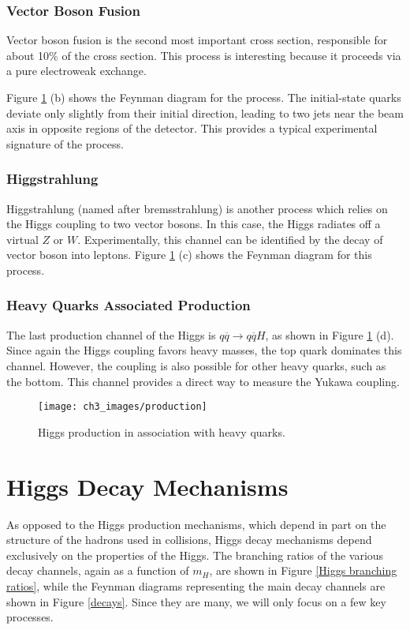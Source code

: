 \documentclass[10pt,a4paper]{book}
\begin{document}
\subsubsection{Vector Boson Fusion}
Vector boson fusion is the second most important cross section, responsible for about 10\% of the cross section. This process is interesting because it proceeds via a pure electroweak exchange. 

Figure \ref{production} (b) shows the Feynman diagram for the process. The initial-state quarks deviate only slightly from their initial direction, leading to two jets near the beam axis in opposite regions of the detector. This provides a typical experimental signature of the process. 


\subsubsection{Higgstrahlung}
Higgstrahlung (named after bremsstrahlung) is another process which relies on the Higgs coupling to two vector bosons. In this case, the Higgs radiates off a virtual $Z$ or $W$. Experimentally, this channel can be identified by the decay of vector boson into leptons. Figure \ref{production} (c) shows the Feynman diagram for this process.


\subsubsection{Heavy Quarks Associated Production}
The last production channel of the Higgs is $q\overline{q}\rightarrow q\overline{q}H$, as shown in Figure \ref{production} (d). Since again the Higgs coupling favors heavy masses, the top quark dominates this channel. However, the coupling is also possible for other heavy quarks, such as the bottom. This channel provides a direct way to measure the Yukawa coupling.

\begin{figure}
\centering
\texttt{[image: ch3\_images/production]}
\caption{Higgs production in association with heavy quarks.}
\label{production}
\end{figure}

\section{Higgs Decay Mechanisms}
As opposed to the Higgs production mechanisms, which depend in part on the structure of the hadrons used in collisions, Higgs decay mechanisms depend exclusively on the properties of the Higgs. The branching ratios of the various decay channels, again as a function of $m_H$, are shown in Figure \ref{Higgs branching ratios}, while the Feynman diagrams representing the main decay channels are shown in Figure \ref{decays}. Since they are many, we will only focus on a few key processes.
\end{document}
